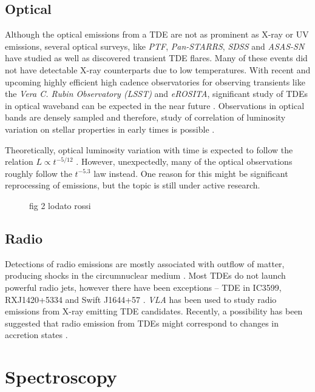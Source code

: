 \documentclass{tda}
\begin{document}
\subsection{Optical}

Although the optical emissions from a TDE are not as prominent as X-ray or UV emissions, several optical surveys, like \textit{PTF}, \textit{Pan-STARRS}, \textit{SDSS} and \textit{ASAS-SN} have studied as well as discovered transient TDE flares. Many of these events did not have detectable X-ray counterparts due to low temperatures. With recent and upcoming highly efficient high cadence observatories for observing transients like the \textit{Vera C. Rubin Observatory (LSST)} and \textit{eROSITA}, significant study of TDEs in optical waveband can be expected in the near future \cite{strubbe_optical_2009}. Observations in optical bands are densely sampled and therefore, study of correlation of luminosity variation on stellar properties in early times is possible \cite{gezari_tidal_2013}.

Theoretically, optical luminosity variation with time is expected to follow the relation \(L \propto t^{-5/12}\) \cite{lodato_multiband_2011}. However, unexpectedly, many of the optical observations roughly follow the \(t^{-5.3}\) law instead. One reason for this might be significant reprocessing of emissions, but the topic is still under active research.

\begin{figure}
	\caption{fig 2 lodato rossi}
\end{figure}

\subsection{Radio}

Detections of radio emissions are mostly associated with outflow of matter, producing shocks in the circumnuclear medium \cite{bonnerot_first_2021}. Most TDEs do not launch powerful radio jets, however there have been exceptions -- TDE in IC3599, RXJ1420+5334 and Swift J1644+57 \cite{komossa_tidal_2015}. \textit{VLA} has been used to study radio emissions from X-ray emitting TDE candidates. Recently, a possibility has been suggested that radio emission from TDEs might correspond to changes in accretion states \cite{horesh_delayed_2021}.

\section{Spectroscopy}
\end{document}
